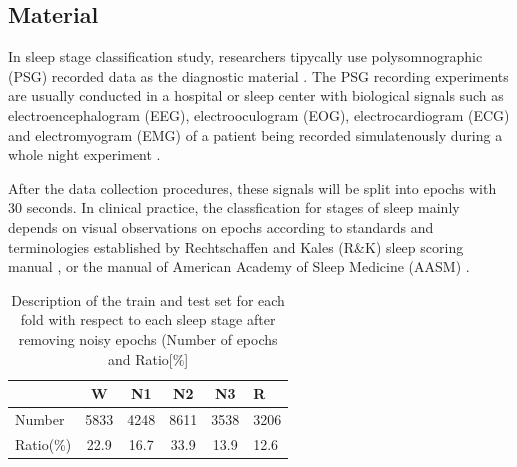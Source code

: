 \documentclass[journal]{IEEEtran}
\begin{document}
\subsection{Material}
In sleep stage classification study, researchers tipycally use polysomnographic (PSG) recorded data as the diagnostic material \cite{prabhavalkar2017analysis}. The PSG recording experiments are usually conducted in a hospital or sleep center with biological signals such as electroencephalogram (EEG), electrooculogram (EOG), electrocardiogram (ECG) and electromyogram (EMG) of a patient being recorded simulatenously during a whole night experiment \cite{ronzhina2012sleep}.

After the data collection procedures, these signals will be split into epochs with 30 seconds. In clinical practice, the classfication for stages of sleep mainly depends on visual observations on epochs according to standards and terminologies established by Rechtschaffen and Kales (R\&K) sleep scoring manual \cite{rechtschaffen1968manual}, or the manual of American Academy of Sleep Medicine (AASM) \cite{berry2012aasm}.

\begin{table}[!t]
\renewcommand{\arraystretch}{1.3}
\caption{Description of the train and test set for each fold with respect to each sleep stage after removing noisy epochs (Number of epochs and Ratio[\%]}
\centering
\begin{tabular}{lccccl}
\toprule
  & W & N1 & N2 & N3 & R\\
\midrule
 Number & 5833 & 4248 & 8611 & 3538 & 3206 \\
 Ratio(\%) & 22.9 & 16.7 & 33.9 & 13.9 & 12.6 \\ 
\end{tabular}
\end{table}
\end{document}
